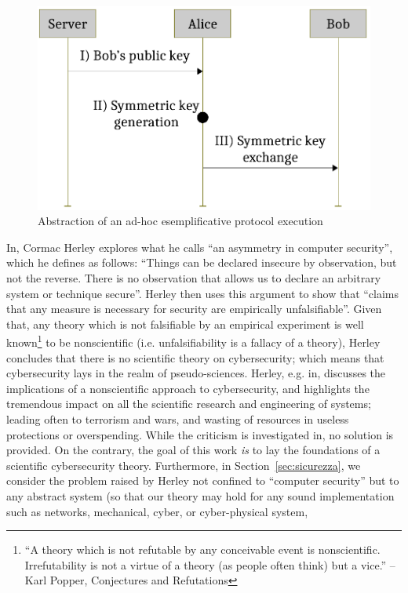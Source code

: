 \begin{figure}[t]
	\centering
	\includegraphics[width=.6\textwidth]{protocol-example.pdf}
	\caption{Abstraction of an ad-hoc esemplificative protocol execution}
	\label{fig:protocol-example}
\end{figure}

In\autocite{Herley2016unfalsifiability}, Cormac Herley explores what he calls
``an asymmetry in computer security'', which he defines as follows: ``Things
can be declared insecure by observation, but not the reverse. There is no
observation that allows us to declare an arbitrary system or technique
secure''. Herley then uses this argument to show that ``claims that any measure
is necessary for security are empirically unfalsifiable''. Given that, any
theory which is not falsifiable by an empirical experiment is well
known\footnote{``A theory which is not refutable by any conceivable event is
nonscientific. Irrefutability is not a virtue of a theory (as people often
think) but a vice.'' -- Karl Popper, Conjectures and
Refutations\autocite{popper1962conjectures}} to be nonscientific (i.e.
unfalsifiability is a fallacy of a theory), Herley concludes that there is no
scientific theory on cybersecurity; which means that cybersecurity lays in the
realm of pseudo-sciences\autocite{Herley2016usenixvideo}.  Herley, e.g.
in\autocite{Herley2017justifying}, discusses the implications of a
nonscientific approach to cybersecurity, and highlights the tremendous impact on
all the scientific research and engineering of systems; leading often to
terrorism and wars, and wasting of resources in useless protections or
overspending.  While the criticism is investigated
in\autocite{Herley2016unfalsifiability}, no solution is provided.  On the
contrary, the goal of this work \emph{is} to lay the foundations of a
scientific cybersecurity theory. Furthermore, in Section~\ref{sec:sicurezza},
we consider the problem raised by Herley not confined to ``computer security''
but to any abstract system (so that our theory may hold for any sound
implementation such as networks, mechanical, cyber, or cyber-physical system,
